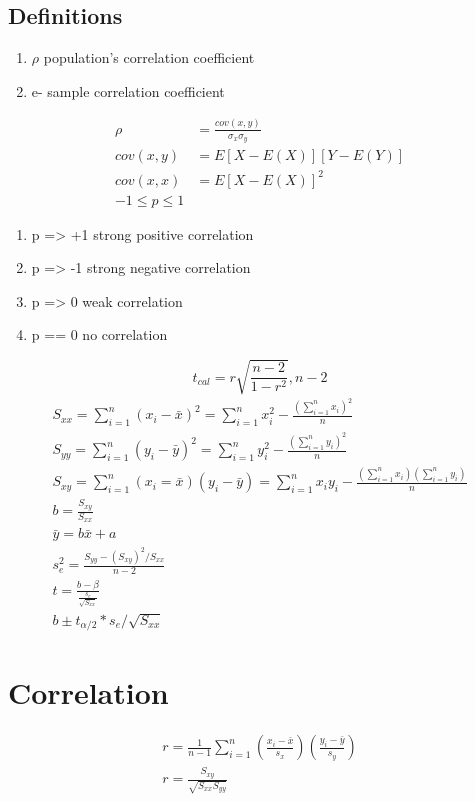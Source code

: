 \documentclass[11pt]{article}
\begin{document}
\subsection{Definitions}
\begin{enumerate}
  \item $\rho$ population's correlation coefficient
  \item e- sample correlation coefficient
\end{enumerate}
\begin{align*}
  \rho &= \frac{cov(x,y)}{\sigma_x\sigma_y}\\
  cov(x,y) &= E[X-E(X)][Y-E(Y)]\\
  cov(x,x) &= E[X-E(X)]^2\\
  -1\le p \le 1
\end{align*}
\begin{enumerate}
  \item p => +1 strong positive correlation
  \item p => -1 strong negative correlation
  \item p => 0 weak correlation
  \item p == 0 no correlation
\end{enumerate}
\begin{equation}
  t_{cal} = r \sqrt{\frac{n-2}{1-r^2}}, n-2
\end{equation}
\begin{align*}
  S_{xx}= \sum_{i=1}^n(x_i-\bar{x})^2  =
  \sum_{i=1}^nx_i^2-\frac{(\sum_{i=1}^nx_i)^2}{n}\\
  S_{yy}= \sum_{i=1}^n(y_i-\bar{y})^2  =
  \sum_{i=1}^ny_i^2-\frac{(\sum_{i=1}^ny_i)^2}{n}\\
  S_{xy} = \sum_{i=1}^n (x_i=\bar{x})(y_i-\bar{y}) =
  \sum_{i=1}^nx_iy_i-\frac{(\sum_{i=1}^nx_i)(\sum_{i=1}^ny_i)}{n}\\
  b = \frac{S_{xy}}{S_{xx}}\\
  \bar{y} = b\bar{x}+a\\
  s_e^2=\frac{S_{yy}-(S_{xy})^2/S_{xx}}{n-2}\\
  t = \frac{b-\beta}{\frac{s_e}{\sqrt{S_{xx}}}}\\
  b\pm t_{\alpha/2}*s_e/\sqrt{S_{xx}}
\end{align*}
\section{Correlation}
\begin{align*}
  r =
  \frac{1}{n-1}\sum_{i=1}^n(\frac{x_i-\bar{x}}{s_x})(\frac{y_i-\bar{y}}{s_y})\\
  r = \frac{S_{xy}}{\sqrt{S_{xx}S_{yy}}}
\end{align*}
\end{document}
